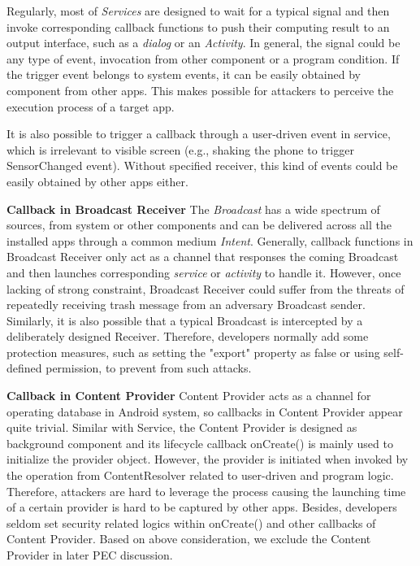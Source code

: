 Regularly, most of \textit{Services} are designed to wait for a typical signal and then invoke corresponding callback functions to push their computing result to an output interface, such as a \textit{dialog} or an \textit{Activity}. In general, the signal could be any type of event, invocation from other component or a program condition. If the trigger event belongs to system events, it can be easily obtained by component from other apps. This makes possible for attackers to perceive the execution process of a target app.

It is also possible to trigger a callback through a user-driven event in service, which is irrelevant to visible screen (e.g., shaking the phone to trigger SensorChanged event). Without specified receiver, this kind of events could be easily obtained by other apps either.   

\textbf{Callback in Broadcast Receiver} 
The \textit{Broadcast} has a wide spectrum of sources, from system or other components and can be delivered across all the installed apps through a common medium \textit{Intent}. Generally, callback functions in Broadcast Receiver only act as a channel that responses the coming Broadcast and then launches corresponding \textit{service} or \textit{activity} to handle it. However, once lacking of strong constraint, Broadcast Receiver could suffer from the threats of repeatedly receiving trash message from an adversary Broadcast sender. Similarly, it is also possible that a typical Broadcast is intercepted by a deliberately designed Receiver. Therefore, developers normally add some protection measures, such as setting the "export" property as false or using self-defined permission, to prevent from such attacks.

\textbf{Callback in Content Provider}
Content Provider acts as a channel for operating database in Android system, so callbacks in Content Provider appear quite trivial. Similar with Service, the Content Provider is designed as background component and its lifecycle callback onCreate() is mainly used to initialize the provider object. However, the provider is initiated when invoked by the operation from ContentResolver related to user-driven and program logic. Therefore, attackers are hard to leverage the process causing the launching time of a certain provider is hard to be captured by other apps. Besides, developers seldom set security related logics within onCreate() and other callbacks of Content Provider. Based on above consideration, we exclude the Content Provider in later PEC discussion.

